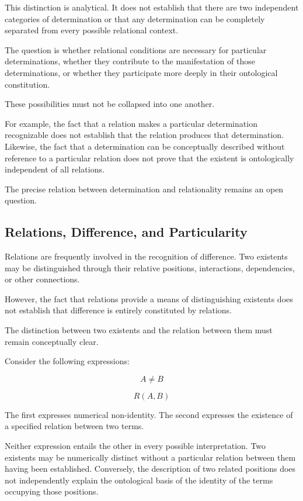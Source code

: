 This distinction is analytical. It does not establish that there are two independent categories of determination or that any determination can be completely separated from every possible relational context.

The question is whether relational conditions are necessary for particular determinations, whether they contribute to the manifestation of those determinations, or whether they participate more deeply in their ontological constitution.

These possibilities must not be collapsed into one another.

For example, the fact that a relation makes a particular determination recognizable does not establish that the relation produces that determination. Likewise, the fact that a determination can be conceptually described without reference to a particular relation does not prove that the existent is ontologically independent of all relations.

The precise relation between determination and relationality remains an open question.

\subsection{Relations, Difference, and Particularity}

Relations are frequently involved in the recognition of difference. Two existents may be distinguished through their relative positions, interactions, dependencies, or other connections.

However, the fact that relations provide a means of distinguishing existents does not establish that difference is entirely constituted by relations.

The distinction between two existents and the relation between them must remain conceptually clear.

Consider the following expressions:

\[
A \neq B
\]

\[
R(A,B)
\]

The first expresses numerical non-identity. The second expresses the existence of a specified relation between two terms.

Neither expression entails the other in every possible interpretation. Two existents may be numerically distinct without a particular relation between them having been established. Conversely, the description of two related positions does not independently explain the ontological basis of the identity of the terms occupying those positions.

